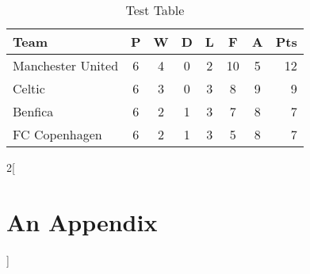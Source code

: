 \documentclass[a4paper, 11pt, oneside]{thesis/HSR}  %
\begin{document}
  \begin{table}
    \begin{center}
      \begin{tabularx}{0.75\textwidth}{ L | *{6}{c} r }
        Team              & P & W & D & L & F  & A & Pts \\
        \hline
        Manchester United & 6 & 4 & 0 & 2 & 10 & 5 & 12  \\
        Celtic            & 6 & 3 & 0 & 3 &  8 & 9 &  9  \\
        Benfica           & 6 & 2 & 1 & 3 &  7 & 8 &  7  \\
        FC Copenhagen     & 6 & 2 & 1 & 3 &  5 & 8 &  7  \\
      \end{tabularx}
      \caption{Test Table}
    \end{center}
  \end{table}



  \appendix %




  \begin{multicols}{2}[\chapter{An Appendix}]
    \label{an_appendix}
    \Blindtext
  \end{multicols}

  \backmatter


  \label{Bibliography}
\end{document}
